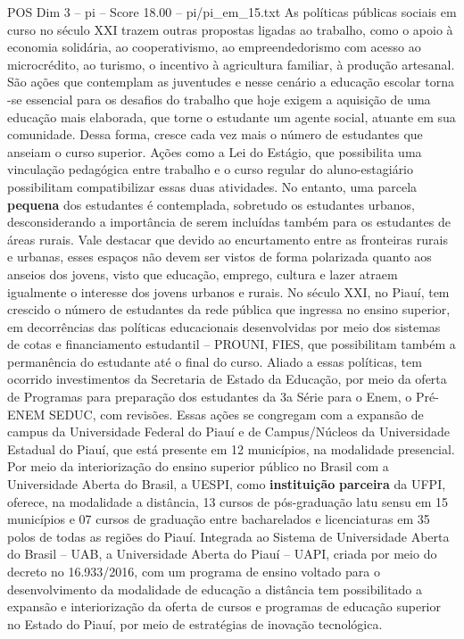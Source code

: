 \begin{textsample}{POS Dim 3 – pi – Score 18.00 – pi/pi\_em\_15.txt}
As políticas públicas sociais em curso no século XXI trazem outras propostas ligadas ao trabalho, como o apoio à economia solidária, ao cooperativismo, ao empreendedorismo com acesso ao microcrédito, ao turismo, o incentivo à agricultura familiar, à produção artesanal.
São ações que contemplam as juventudes e nesse cenário a educação escolar torna -se essencial para os desafios do trabalho que hoje exigem a aquisição de uma educação mais elaborada, que torne o estudante um agente social, atuante em sua comunidade.
Dessa forma, cresce cada vez mais o número de estudantes que anseiam o curso superior.
Ações como a Lei do Estágio, que possibilita uma vinculação pedagógica entre trabalho e o curso regular do aluno-estagiário possibilitam compatibilizar essas duas atividades.
No entanto, uma parcela \textbf{pequena} dos estudantes é contemplada, sobretudo os estudantes urbanos, desconsiderando a importância de serem incluídas também para os estudantes de áreas rurais.
Vale destacar que devido ao encurtamento entre as fronteiras rurais e urbanas, esses espaços não devem ser vistos de forma polarizada quanto aos anseios dos jovens, visto que educação, emprego, cultura e lazer atraem igualmente o interesse dos jovens urbanos e rurais.
No século XXI, no Piauí, tem crescido o número de estudantes da rede pública que ingressa no ensino superior, em decorrências das políticas educacionais desenvolvidas por meio dos sistemas de cotas e financiamento estudantil – PROUNI, FIES, que possibilitam também a permanência do estudante até o final do curso.
Aliado a essas políticas, tem ocorrido investimentos da Secretaria de Estado da Educação, por meio da oferta de Programas para preparação dos estudantes da 3a Série para o Enem, o Pré-ENEM SEDUC, com revisões.
Essas ações se congregam com a expansão de campus da Universidade Federal do Piauí e de Campus/Núcleos da Universidade Estadual do Piauí, que está presente em 12 municípios, na modalidade presencial.
Por meio da interiorização do ensino superior público no Brasil com a Universidade Aberta do Brasil, a UESPI, como \textbf{instituição} \textbf{parceira} da UFPI, oferece, na modalidade a distância, 13 cursos de pós-graduação latu sensu em 15 municípios e 07 cursos de graduação entre bacharelados e licenciaturas em 35 polos de todas as regiões do Piauí.
Integrada ao Sistema de Universidade Aberta do Brasil – UAB, a Universidade Aberta do Piauí – UAPI, criada por meio do decreto no 16.933/2016, com um programa de ensino voltado para o desenvolvimento da modalidade de educação a distância tem possibilitado a expansão e interiorização da oferta de cursos e programas de educação superior no Estado do Piauí, por meio de estratégias de inovação tecnológica.

\end{textsample}
